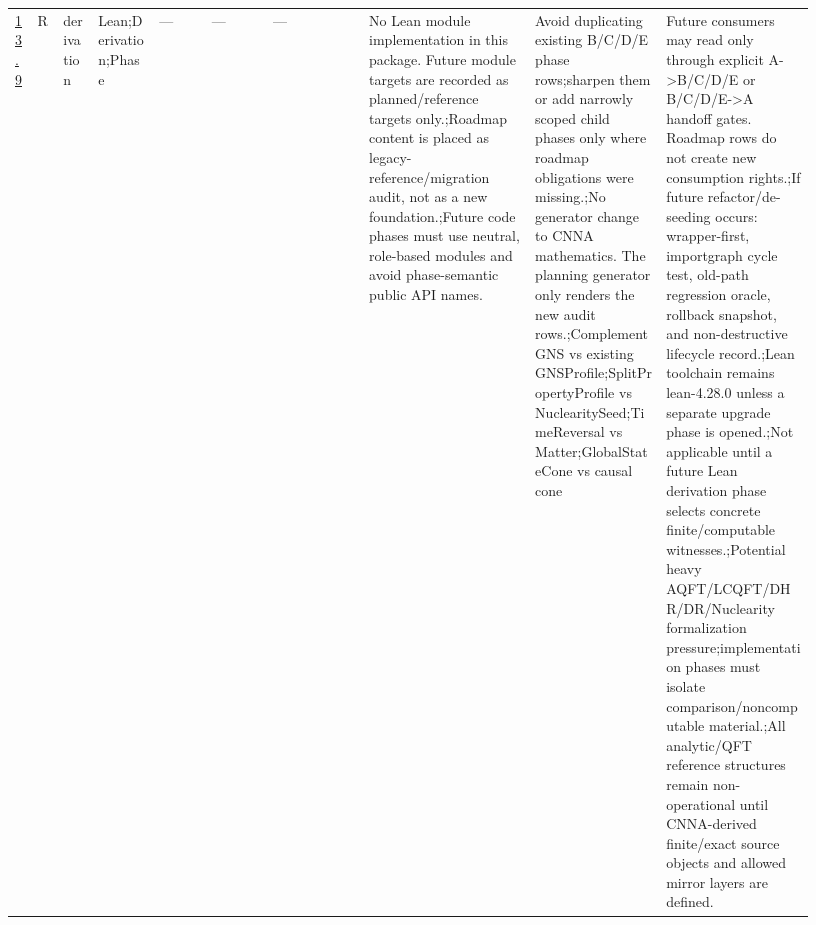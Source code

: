 \begin{longtable}{L{0.026\linewidth} L{0.024\linewidth} L{0.045\linewidth} L{0.07\linewidth} L{0.065\linewidth} L{0.075\linewidth} L{0.11\linewidth} L{0.19\linewidth} L{0.155\linewidth} L{0.17\linewidth}}
\hline
\addlinespace[0.24em]
\hyperlink{phase-row-13-9}{13.9} & R & derivation & Lean;\newline Derivation;\newline Phase & --- & --- & --- & No Lean module implementation in this package. Future module targets are recorded as planned/\allowbreak{}reference targets only.;\newline Roadmap content is placed as legacy-reference/\allowbreak{}migration audit, not as a new foundation.;\newline Future code phases must use neutral, role-based modules and avoid phase-semantic public API names. & Avoid duplicating existing B/\allowbreak{}C/\allowbreak{}D/\allowbreak{}E phase rows;\newline sharpen them or add narrowly scoped child phases only where roadmap obligations were missing.;\newline No generator change to CNNA mathematics. The planning generator only renders the new audit rows.;\newline ComplementGNS vs existing GNSProfile;\newline SplitPropertyProfile vs NuclearitySeed;\newline TimeReversal vs Matter;\newline GlobalStateCone vs causal cone & Future consumers may read only through explicit A->B/\allowbreak{}C/\allowbreak{}D/\allowbreak{}E or B/\allowbreak{}C/\allowbreak{}D/\allowbreak{}E->A handoff gates. Roadmap rows do not create new consumption rights.;\newline If future refactor/\allowbreak{}de-seeding occurs: wrapper-first, importgraph cycle test, old-path regression oracle, rollback snapshot, and non-destructive lifecycle record.;\newline Lean toolchain remains lean-4.28.0 unless a separate upgrade phase is opened.;\newline Not applicable until a future Lean derivation phase selects concrete finite/\allowbreak{}computable witnesses.;\newline Potential heavy AQFT/\allowbreak{}LCQFT/\allowbreak{}DHR/\allowbreak{}DR/\allowbreak{}Nuclearity formalization pressure;\newline implementation phases must isolate comparison/\allowbreak{}noncomputable material.;\newline All analytic/\allowbreak{}QFT reference structures remain non-operational until CNNA-derived finite/\allowbreak{}exact source objects and allowed mirror layers are defined.\\

\end{longtable}

